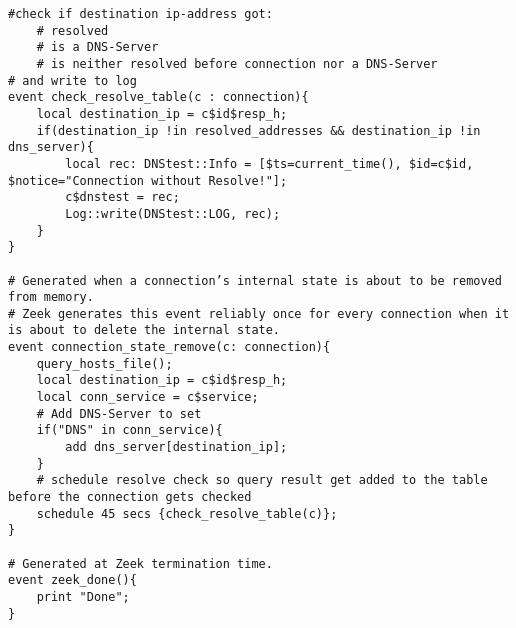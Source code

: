 \begin{lstlisting}[firstnumber=54,linerange={54-59,62-67},caption={Überprüfung der Verbindungsziele eines Endgerätes}]
#check if destination ip-address got:
    # resolved
    # is a DNS-Server
    # is neither resolved before connection nor a DNS-Server
# and write to log
event check_resolve_table(c : connection){
    local destination_ip = c$id$resp_h;
    if(destination_ip !in resolved_addresses && destination_ip !in dns_server){
        local rec: DNStest::Info = [$ts=current_time(), $id=c$id, $notice="Connection without Resolve!"];
        c$dnstest = rec;
        Log::write(DNStest::LOG, rec);
    }
}

# Generated when a connection’s internal state is about to be removed from memory.
# Zeek generates this event reliably once for every connection when it is about to delete the internal state.
event connection_state_remove(c: connection){
    query_hosts_file();
    local destination_ip = c$id$resp_h;
    local conn_service = c$service;
    # Add DNS-Server to set
    if("DNS" in conn_service){
        add dns_server[destination_ip];
    }
    # schedule resolve check so query result get added to the table before the connection gets checked 
    schedule 45 secs {check_resolve_table(c)}; 
}

# Generated at Zeek termination time.
event zeek_done(){
    print "Done";
}
\end{lstlisting}

